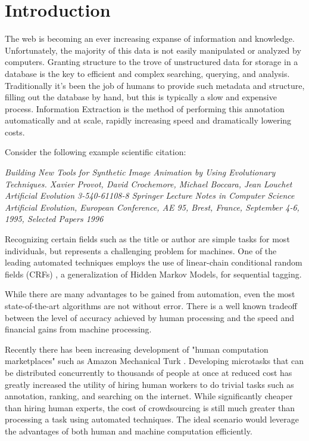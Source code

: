 \section{Introduction}

The web is becoming an ever increasing expanse of information and knowledge.  Unfortunately, the majority of this data is not easily manipulated or analyzed by computers.  Granting structure to the trove of unstructured data for storage in a database is the key to efficient and complex searching, querying, and analysis.  Traditionally it's been the job of humans to provide such metadata and structure, filling out the database by hand, but this is typically a slow and expensive process.  Information Extraction is the method of performing this annotation automatically and at scale, rapidly increasing speed and dramatically lowering costs.

\begin{example}
\label{ex:citation}
Consider the following example scientific citation:

\vspace{5mm}
\parbox{.45\textwidth}{\textit{Building New Tools for Synthetic Image Animation by Using Evolutionary Techniques. Xavier Provot, David Crochemore, Michael Boccara, Jean Louchet Artificial Evolution 3-540-61108-8 Springer Lecture Notes in Computer Science Artificial Evolution, European Conference, AE 95, Brest, France, September 4-6, 1995, Selected Papers 1996}}
\vspace{5mm}

\end{example}

Recognizing certain fields such as the title or author are simple tasks for most individuals, but represents a challenging problem for machines.  One of the leading automated techniques employs the use of linear-chain conditional random fields (CRFs) \cite{DBLP:conf/icml/LaffertyMP01}, a generalization of Hidden Markov Models, for sequential tagging.

While there are many advantages to be gained from automation, even the most state-of-the-art algorithms are not without error.  There is a well known tradeoff \cite{Quinn10crowdflow:integrating} between the level of accuracy achieved by human processing and the speed and financial gains from machine processing.  

Recently there has been increasing development of "human computation marketplaces" such as Amazon Mechanical Turk \cite{Ipeirotis:2010:AAM:1869086.1869094}.  Developing microtasks that can be distributed concurrently to thousands of people at once at reduced cost has greatly increased the utility of hiring human workers to do trivial tasks such as annotation, ranking, and searching on the internet.  While significantly cheaper than hiring human experts, the cost of crowdsourcing is still much greater than processing a task using automated techniques.  The ideal scenario would leverage the advantages of both human and machine computation efficiently.

